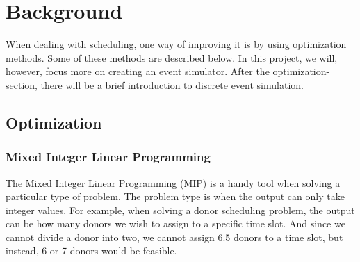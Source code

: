 \documentclass[a4paper,12pt]{article}
\begin{document}
\section{Background} 

When dealing with scheduling, one way of improving it is by using optimization methods. Some of these methods are described below. In this project, we will, however, focus more on creating an event simulator. After the optimization-section, there will be a brief introduction to discrete event simulation.

\subsection{Optimization}

\subsubsection{Mixed Integer Linear Programming}

The Mixed Integer Linear Programming (MIP) is a handy tool when solving a particular type of problem. The problem type is when the output can only take integer values. For example, when solving a donor scheduling problem, the output can be how many donors we wish to assign to a specific time slot. And since we cannot divide a donor into two, we cannot assign 6.5 donors to a time slot, but instead, 6 or 7 donors would be feasible.


\bigbreak
\end{document}
